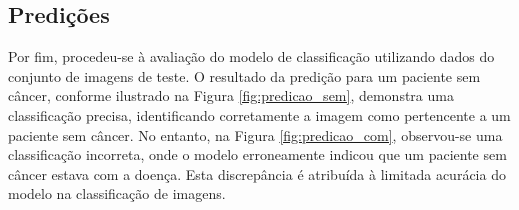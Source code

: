 















\subsection{\esp Predições} \label{pred}

Por fim, procedeu-se à avaliação do modelo de classificação utilizando dados do conjunto de imagens de teste. O resultado da predição para um paciente sem câncer, conforme ilustrado na Figura \ref{fig:predicao_sem}, demonstra uma classificação precisa, identificando corretamente a imagem como pertencente a um paciente sem câncer. No entanto, na Figura \ref{fig:predicao_com}, observou-se uma classificação incorreta, onde o modelo erroneamente indicou que um paciente sem câncer estava com a doença. Esta discrepância é atribuída à limitada acurácia do modelo na classificação de imagens.

